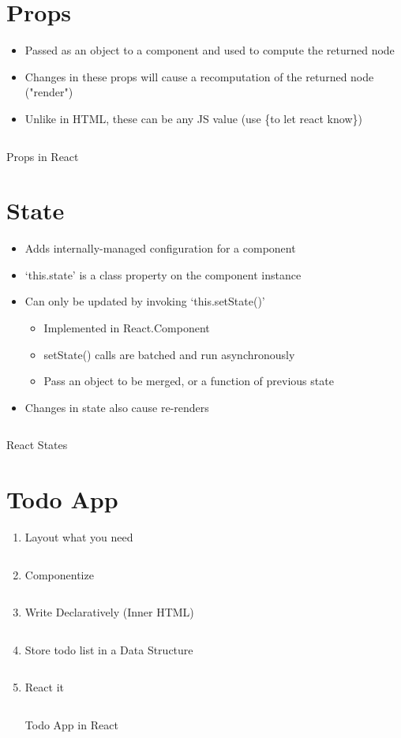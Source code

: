 \section{Props}
\begin{itemize}
	\item Passed as an object to a component and used to compute the returned node
	\item Changes in these props will cause a recomputation of the returned node
	      ("render")
	\item Unlike in HTML, these can be any JS value (use \{to let react know\})
\end{itemize}

\begin{code}
	\inputminted{js}{src2/a-props.js}
	\caption{Props in React}
\end{code}

\section{State}
\begin{itemize}
	\item Adds internally-managed configuration for a component
	\item `this.state' is a class property on the component instance
	\item Can only be updated by invoking `this.setState()'
	      \begin{itemize}
		      \item Implemented in React.Component
		      \item setState() calls are batched and run asynchronously
		      \item Pass an object to be merged, or a function of previous state
	      \end{itemize}
	\item Changes in state also cause re-renders
\end{itemize}

\begin{code}
	\inputminted{js}{src2/b-state.js}
	\caption{React States}
\end{code}

\clearpage
\section{Todo App}
\begin{enumerate}
	\item Layout what you need
	      \inputminted{js}{src2/todoApp0.js}
	\item Componentize
	      \inputminted{js}{src2/todoApp1.js}
	\item Write Declaratively (Inner HTML)
	      \inputminted{js}{src2/todoApp2.js}
	\item Store todo list in a Data Structure
	      \inputminted{js}{src2/todoApp3.js}
	\item React it
	      \begin{code}
		      \inputminted{js}{src2/todoApp4-react.js}
		      \caption{Todo App in React}
	      \end{code}
\end{enumerate}

